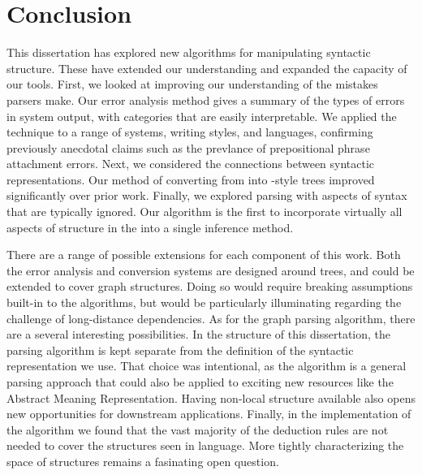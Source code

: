 \chapter{Conclusion}

This dissertation has explored new algorithms for manipulating syntactic structure.
These have extended our understanding and expanded the capacity of our tools.
First, we looked at improving our understanding of the mistakes parsers make.
Our error analysis method gives a summary of the types of errors in system output, with categories that are easily interpretable.
We applied the technique to a range of systems, writing styles, and languages, confirming previously anecdotal claims such as the prevlance of prepositional phrase attachment errors.
Next, we considered the connections between syntactic representations.
Our method of converting from \ccg into \ptb-style trees improved significantly over prior work.
Finally, we explored parsing with aspects of syntax that are typically ignored.
Our algorithm is the first to incorporate virtually all aspects of structure in the \ptb into a single inference method.

There are a range of possible extensions for each component of this work.
Both the error analysis and conversion systems are designed around trees, and could be extended to cover graph structures.
Doing so would require breaking assumptions built-in to the algorithms, but would be particularly illuminating regarding the challenge of long-distance dependencies.
As for the graph parsing algorithm, there are a several interesting possibilities.
In the structure of this dissertation, the parsing algorithm is kept separate from the definition of the syntactic representation we use.
That choice was intentional, as the algorithm is a general parsing approach that could also be applied to exciting new resources like the Abstract Meaning Representation.
Having non-local structure available also opens new opportunities for downstream applications.
Finally, in the implementation of the algorithm we found that the vast majority of the deduction rules are not needed to cover the structures seen in language.
More tightly characterizing the space of structures remains a fasinating open question.
